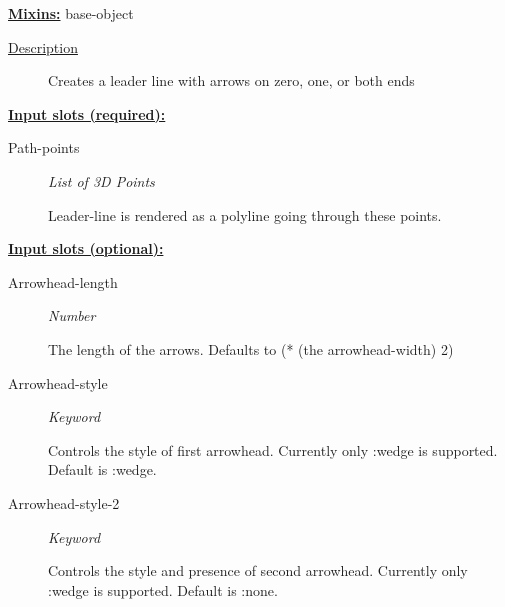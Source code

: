 \documentclass [11pt]{book}
\begin{document}
\begin{itemize}
\textbf{
\underline{Mixins:}} base-object





\begin{description}

\item [
\underline{Description}]


Creates a leader line with arrows on zero, one, or both ends



\end{description}








\textbf{
\underline{Input slots (required):}}

\begin{description}

\item [Path-points]
\emph{List of 3D Points}

 Leader-line is rendered as a polyline going through these points.




\end{description}






\textbf{
\underline{Input slots (optional):}}

\begin{description}

\item [Arrowhead-length]
\emph{Number}

 The length of the arrows. Defaults to (* (the arrowhead-width) 2)




\item [Arrowhead-style]
\emph{Keyword}

 Controls the style of first arrowhead. Currently only :wedge is supported. Default is :wedge.




\item [Arrowhead-style-2]
\emph{Keyword}

 Controls the style and presence of second arrowhead.
Currently only :wedge is supported. Default is :none.





\end{description}
\end{itemize}
\end{document}
